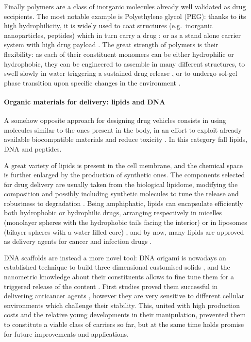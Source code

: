Finally polymers are a class of inorganic molecules already well validated as drug eccipients. The most notable example is Polyethylene glycol (PEG): thanks to its high hydrophilicity, it is widely used to coat structures (e.g.\ inorganic nanoparticles, peptides) which in turn carry a drug \cite{Lammers2009}; or as a stand alone carrier system with high drug payload \cite{Liechty2010}. The great strength of polymers is their flexibility: as each of their constituent monomers can be either hydrophilic or hydrophobic, they can be engineered to assemble in many different structures, to swell slowly in water triggering a sustained drug release \cite{Nicolas2013}, or to undergo sol-gel phase transition upon specific changes in the environment \cite{Liechty2010}.


\paragraph{Organic materials for delivery: lipids and DNA} \label{sec:organic}

A somehow opposite approach for designing drug vehicles consists in using molecules similar to the ones present in the body, in an effort to exploit already available biocompatible materials and reduce toxicity \cite{Yoo2011}. In this category fall lipids, DNA and peptides.

A great variety of lipids is present in the cell membrane, and the chemical space is further enlarged by the production of synthetic ones. The components selected for drug delivery are usually taken from the biological lipidome, modifying the composition and possibly including synthetic molecules to tune the release and robustness to degradation \cite{Yingchoncharoen2016}.
%
Being amphiphatic, lipids can encapsulate efficiently both hydrophobic or hydrophilic drugs, arranging respectively in micelles (monolayer spheres with the hydrophobic tails facing the interior) or in liposomes (bilayer spheres with a water filled core) \cite{Bunker2016}, and by now, many lipids are approved as delivery agents for cancer and infection drugs \cite{Pattni2015paper, Jain2017}.

DNA scaffolds are instead a more novel tool: DNA origami is nowadays an established technique to build three dimensional customised solids \cite{Linko2015}, and the nanometric knowledge about their constituents allows to fine tune them for a triggered release of the content \cite{Douglas2012}. First studies proved them successful in delivering anticancer agents \cite{Zhang2014, Jiang2012}, however they are very sensitive to different cellular environments which challenge their stability. This, united with high production costs and the relative young developments in their manipulation, prevented them to constitute a viable class of carriers so far, but at the same time holds promise for future improvements and applications.


